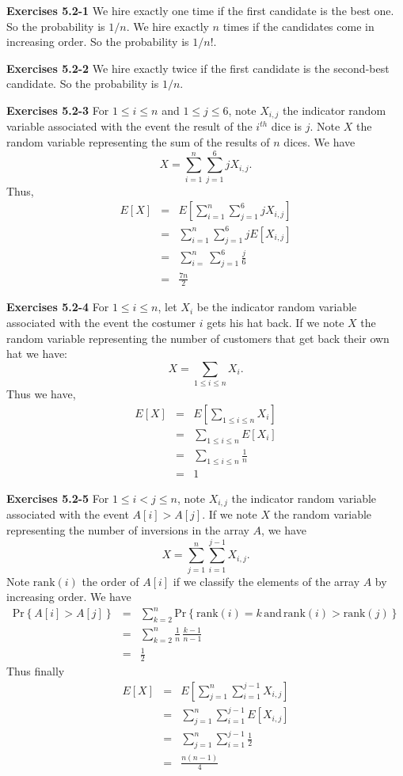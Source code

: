 \documentclass[a4paper,12pt]{article}
\newcommand{\newpar}[1]
{\bigskip \noindent \textbf{Exercises #1} \newline}
\newcommand{\prob}[1]{\mathrm{Pr}\left\{ #1 \right\}}
\begin{document}
\newpar{5.2-1}
We hire exactly one time if the first candidate is the best one.  So
the probability is $1/n$.
We hire exactly $n$ times if the candidates come in increasing order.
So the probability is $1/n!$.

\newpar{5.2-2}
We hire exactly twice if the first candidate is the second-best
candidate.  So the probability is $1/n$.

\newpar{5.2-3} For $1\le i\le n$ and $1\le j\le 6$, note $X_{i,j}$ the
indicator random variable associated with the event the result of the
$i^{th}$ dice is $j$.  Note $X$ the random variable representing the
sum of the results of $n$ dices.  We have
\[ X = \sum_{i=1}^n\sum_{j=1}^6jX_{i,j}.\]
Thus,
\begin{eqnarray*}
  E[X] &=& E\left[\sum_{i=1}^n\sum_{j=1}^6jX_{i,j}\right] \\
  &=& \sum_{i=1}^n\sum_{j=1}^6jE[X_{i,j}] \\
  &=& \sum_{i=}^n\sum_{j=1}^6\frac{j}{6} \\
  &=& \frac{7n}{2}
\end{eqnarray*}

\newpar{5.2-4}
For $1\le i\le n$, let $X_i$ be the indicator random variable
associated with the event the costumer $i$ gets his hat back.  If we
note $X$ the random variable representing the number of customers that
get back their own hat we have:
\[ X = \sum_{1\le i\le n}X_i.\]
Thus we have,
\begin{eqnarray*}
  E[X] &=& E\left[\sum_{1\le i\le n}X_i\right] \\
  &=& \sum_{1\le i\le n} E[X_i] \\
  &=& \sum_{1\le i\le n} \frac{1}{n} \\
  &=& 1
\end{eqnarray*}

\newpar{5.2-5}
For $1\le i < j\le n$, note $X_{i,j}$ the indicator random variable
associated with the event $A[i] > A[j]$.  If we note $X$ the random
variable representing the number of inversions in the array $A$, we
have
\[ X = \sum_{j=1}^n \sum_{i=1}^{j-1}X_{i,j}.\]
Note $\mathrm{rank}(i)$ the order of $A[i]$ if we classify the
elements of the array $A$ by increasing order.  We have
\begin{eqnarray*}
  \prob{A[i] > A[j]} &=& \sum_{k=2}^n\prob{\mathrm{rank}(i) =
    k\,\mbox{and}\,\mathrm{rank}(i) > \mathrm{rank}(j)} \\
  &=& \sum_{k=2}^n \frac{1}{n} \,\frac{k-1}{n-1} \\
  &=& \frac{1}{2}
\end{eqnarray*}
Thus finally
\begin{eqnarray*}
  E[X] &=& E\left[\sum_{j=1}^n\sum_{i=1}^{j-1} X_{i,j}\right] \\
  &=& \sum_{j=1}^n\sum_{i=1}^{j-1} E[X_{i,j}] \\
  &=& \sum_{j=1}^n \sum_{i=1}^{j-1} \frac{1}{2} \\
  &=& \frac{n(n-1)}{4}
\end{eqnarray*}
\end{document}
